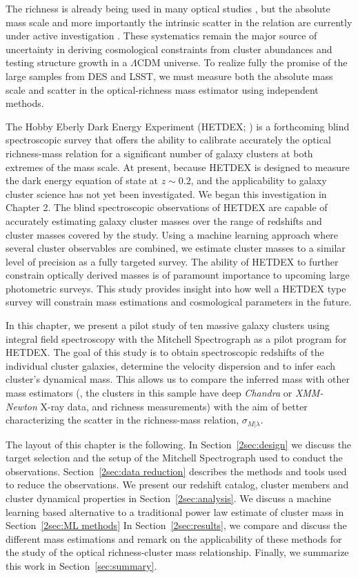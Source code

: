 The richness is already being used in many optical studies , but the absolute mass scale and more importantly the intrinsic scatter in the relation are currently under active investigation . These systematics remain the major source of uncertainty in deriving cosmological constraints from cluster abundances and testing structure growth in a $\Lambda$CDM universe. To realize fully the promise of the large samples from DES and LSST, we must measure both the absolute mass scale and scatter in the optical-richness mass estimator using independent methods.

The Hobby Eberly Dark Energy Experiment (HETDEX; \citealt{Hill2008}) is a forthcoming blind spectroscopic survey that offers the ability to calibrate accurately the optical richness-mass relation for a significant number of galaxy clusters at both extremes of the mass scale. At present, because HETDEX is designed to measure the dark energy equation of state at $z\sim0.2$, and the applicability to galaxy cluster science has not yet been investigated.  We began this investigation in Chapter 2. The blind spectroscopic observations of HETDEX are capable of accurately estimating galaxy cluster masses over the range of redshifts and cluster masses covered by the study. Using a machine learning approach where several cluster observables are combined, we estimate cluster masses to a similar level of precision as a fully targeted survey. The ability of HETDEX to further constrain optically derived masses is of paramount importance to upcoming large photometric surveys. This study provides insight into how well a HETDEX type survey will constrain mass estimations and cosmological parameters in the future.

In this chapter, we present a pilot study of ten massive galaxy clusters using integral field spectroscopy with the Mitchell Spectrograph as a pilot program for HETDEX. The goal of this study is to obtain spectroscopic redshifts of the individual cluster galaxies, determine the velocity dispersion and to infer each cluster's dynamical mass. This allows us to compare the inferred mass with other mass estimators (\eg, the clusters in this sample have deep \textit{Chandra} or \textit{XMM-Newton} X-ray data, and richness measurements) with the aim of better characterizing the scatter in the richness-mass relation, $\sigma_{M|\lambda}$.

The layout of this chapter is the following. In Section~\ref{2sec:design} we discuss the target selection and the setup of the Mitchell Spectrograph used to conduct the observations. Section~\ref{2sec:data reduction} describes the methods and tools used to reduce the observations. We present our redshift catalog, cluster members and cluster dynamical properties in Section~\ref{2sec:analysis}. We discuss a machine learning based alternative to a traditional power law estimate of cluster mass in Section~\ref{2sec:ML methods} In Section~\ref{2sec:results}, we compare and discuss the different mass estimations and remark on the applicability of these methods for the study of the optical richness-cluster mass relationship.  Finally, we summarize this work in Section~\ref{sec:summary}.

